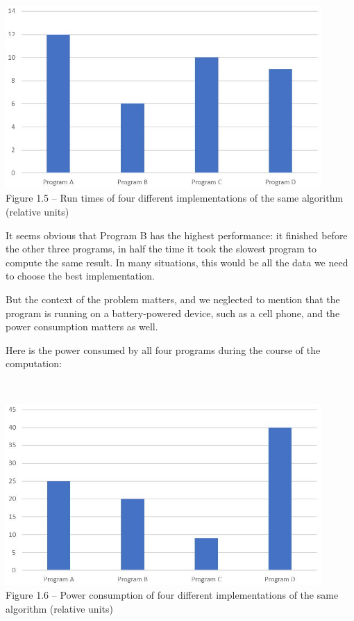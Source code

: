 \hspace*{\fill} \\ %
\begin{center}
\includegraphics[width=0.9\textwidth]{content/1/chapter1/images/5.jpg}\\
Figure 1.5 – Run times of four different implementations of the same algorithm (relative units)
\end{center}

It seems obvious that Program B has the highest performance: it finished before the other three programs, in half the time it took the slowest program to compute the same result. In many situations, this would be all the data we need to choose the best implementation.

But the context of the problem matters, and we neglected to mention that the program is running on a battery-powered device, such as a cell phone, and the power consumption matters as well.


Here is the power consumed by all four programs during the course of the computation:

\hspace*{\fill} \\ %
\begin{center}
\includegraphics[width=0.9\textwidth]{content/1/chapter1/images/6.jpg}\\
Figure 1.6 – Power consumption of four different implementations of the same algorithm (relative units)
\end{center}

